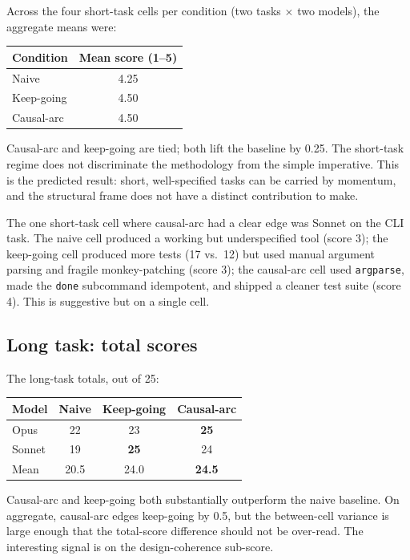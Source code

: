 \documentclass[11pt]{article}
\begin{document}
Across the four short-task cells per condition (two tasks $\times$ two
models), the aggregate means were:

\begin{center}
\begin{tabular}{lc}
\toprule
Condition & Mean score (1--5) \\
\midrule
Naive       & 4.25 \\
Keep-going  & 4.50 \\
Causal-arc  & 4.50 \\
\bottomrule
\end{tabular}
\end{center}

\noindent Causal-arc and keep-going are tied; both lift the baseline by
0.25. The short-task regime does not discriminate the methodology from
the simple imperative. This is the predicted result: short, well-specified
tasks can be carried by momentum, and the structural frame does not have a
distinct contribution to make.

The one short-task cell where causal-arc had a clear edge was Sonnet on
the CLI task. The naive cell produced a working but underspecified tool
(score 3); the keep-going cell produced more tests (17 vs.\ 12) but used
manual argument parsing and fragile monkey-patching (score 3); the
causal-arc cell used \texttt{argparse}, made the \texttt{done} subcommand
idempotent, and shipped a cleaner test suite (score 4). This is suggestive
but on a single cell.

\subsection{Long task: total scores}

The long-task totals, out of 25:

\begin{center}
\begin{tabular}{lccc}
\toprule
Model  & Naive & Keep-going & Causal-arc \\
\midrule
Opus   & 22 & 23 & \textbf{25} \\
Sonnet & 19 & \textbf{25} & 24 \\
\midrule
Mean   & 20.5 & 24.0 & \textbf{24.5} \\
\bottomrule
\end{tabular}
\end{center}

\noindent Causal-arc and keep-going both substantially outperform the naive
baseline. On aggregate, causal-arc edges keep-going by 0.5, but the
between-cell variance is large enough that the total-score difference
should not be over-read. The interesting signal is on the design-coherence
sub-score.
\end{document}
